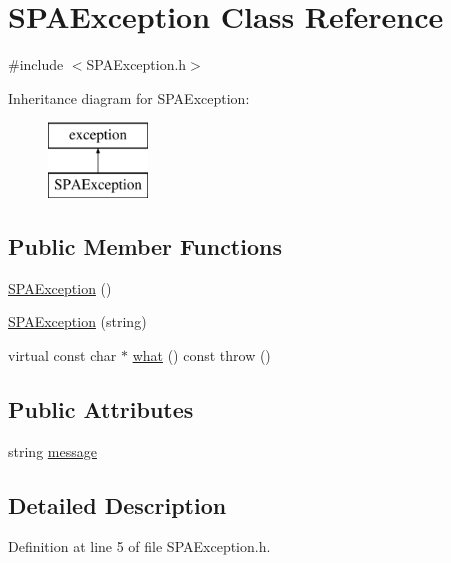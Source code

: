 \hypertarget{class_s_p_a_exception}{\section{S\-P\-A\-Exception Class Reference}
\label{class_s_p_a_exception}
}


{\ttfamily \#include $<$S\-P\-A\-Exception.\-h$>$}

Inheritance diagram for S\-P\-A\-Exception\-:\begin{figure}[H]
\begin{center}
\leavevmode
\includegraphics[height=2.000000cm]{class_s_p_a_exception}
\end{center}
\end{figure}
\subsection*{Public Member Functions}
\begin{DoxyCompactItemize}
\item 
\hyperlink{class_s_p_a_exception_a8f17fd2540fce63ba93e51c51765010d}{S\-P\-A\-Exception} ()
\item 
\hyperlink{class_s_p_a_exception_a422623fc7b2c546620c231cf8eebd53b}{S\-P\-A\-Exception} (string)
\item 
virtual const char $\ast$ \hyperlink{class_s_p_a_exception_a968d8912a66e211f71e47a710f5d6667}{what} () const   throw ()
\end{DoxyCompactItemize}
\subsection*{Public Attributes}
\begin{DoxyCompactItemize}
\item 
string \hyperlink{class_s_p_a_exception_a01dacc987941a94c516cb08988dc7d51}{message}
\end{DoxyCompactItemize}


\subsection{Detailed Description}


Definition at line 5 of file S\-P\-A\-Exception.\-h.



